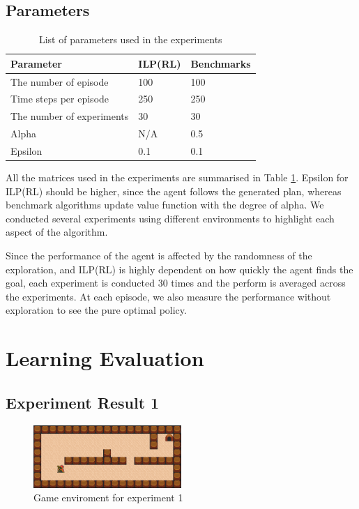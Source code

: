\subsection{Parameters}
\begin{table}[!ht!b]
\centering
\begin{tabular}{lll}
\hline
Parameter            & ILP(RL)    & Benchmarks      \\ \hline
The number of episode& 100        & 100        \\
Time steps per episode& 250        & 250        \\
The number of experiments& 30       & 30       \\
Alpha                & N/A       & 0.5       \\
Epsilon              & 0.1        & 0.1        \\
\end{tabular}
\caption{List of parameters used in the experiments}
\label{param}
\end{table}

All the matrices used in the experiments are summarised in Table \ref{param}.
Epsilon for ILP(RL) should be higher, since the agent follows the generated plan,
whereas benchmark algorithms update value function with the degree of alpha.
We conducted several experiments using different environments to highlight each aspect of the algorithm.

Since the performance of the agent is affected by the randomness of the exploration,
and ILP(RL) is highly dependent on how quickly the agent finds the goal,
each experiment is conducted 30 times and the perform is averaged across the experiments.
At each episode, we also measure the performance without exploration to see the pure optimal policy.

\section{Learning Evaluation}
\label{sec:learning_evaluation}

\subsection{Experiment Result 1}
\label{subsec:experiment_result_2}

\begin{figure}[!htb]
\centering
\includegraphics[width=0.5\textwidth]{./figures/experiment1}
\caption{Game enviroment for experiment 1}
\label{experiment1}
\end{figure}

